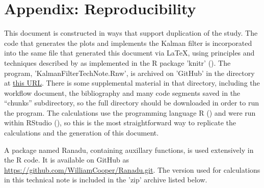 \documentclass[12pt,twoside,english,12pt,twoside,english]{article}\usepackage[]{graphicx}\usepackage[]{color}
\let\stdsection\section
\renewcommand{\section}{\newpage\stdsection}
\let\OrgIndex\index
\renewcommand*{\index}[1]{\OrgIndex{#1}}
\begin{document}
\appendix

\section{Appendix: Reproducibility}

This document is constructed in ways that
support duplication of the study. The code that generates the plots
and implements the Kalman filter is incorporated into the same file
that generated this document via \LaTeX, using principles and techniques
described by \citet{Xie2014a} as implemented in the R package
'knitr' (\citet{Xie2014b}). The program, 'KalmanFilterTechNote.Rnw',
is archived on 'GitHub' in the directory
at \href{https://github.com/WilliamCooper/KalmanFilter.git}{this URL}.
There is some supplemental material
in that directory, including the workflow document,
the bibliography and many code segments saved in the ``chunks''
subdirectory, so the full directory should be downloaded in order
to run the program. The calculations use the programming language
R (\citet{Rlanguage})
and were run within RStudio (\citet{RStudio2012}),
so this is the most straightforward way to replicate the calculations
and the generation of this document.

A package named Ranadu,
containing auxillary functions, is used extensively
in the R code. It is available on GitHub
as \href{https://github.com/WilliamCooper/Ranadu.git}{https://github.com/WilliamCooper/Ranadu.git}.
The version used for calculations in this technical note is included
in the 'zip' archive listed below.
\end{document}
